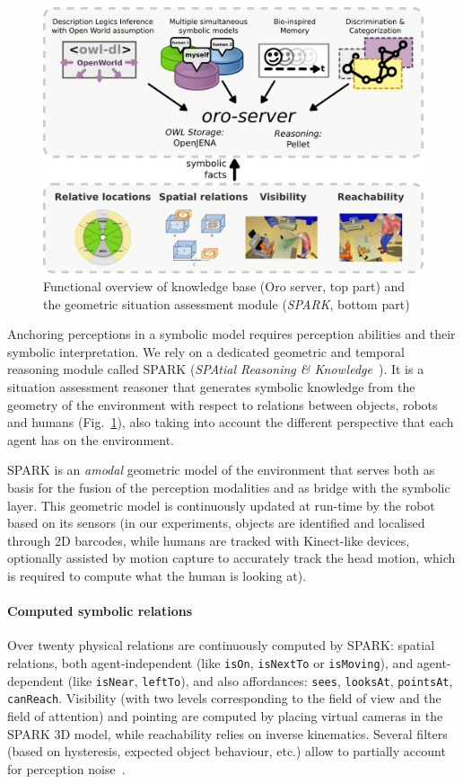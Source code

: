 \documentclass[letterpaper, 10 pt, conference]{ieeeconf}  %
\newcommand{\concept}[1]{{\small \texttt{#1}}}
\begin{document}
\begin{figure}
        \centering
        \includegraphics[width=\columnwidth]{spark-oro}
    \caption{Functional overview of knowledge base ({\sc Oro} server, top part) and the geometric situation assessment module (\emph{SPARK}, bottom part)}
        \label{fig|spark-oro}
\end{figure}

Anchoring perceptions in a symbolic model requires perception abilities and
their symbolic interpretation. We rely on a dedicated geometric and temporal
reasoning module called SPARK (\emph{SPAtial Reasoning \&
Knowledge}~\cite{Sisbot2011}). It is a situation assessment reasoner that
generates symbolic knowledge from the geometry of the environment with respect
to relations between objects, robots and humans (Fig.~\ref{fig|spark-oro}),
also taking into account the different perspective that each agent has on the
environment.

SPARK is an \emph{amodal} geometric model of the environment that serves both
as basis for the fusion of the perception modalities and as bridge with the
symbolic layer. This geometric model is continuously updated at run-time by the
robot based on its sensors (in our experiments, objects are identified and
localised through 2D barcodes, while humans are tracked with Kinect-like
devices, optionally assisted by motion capture to accurately track the head
motion, which is required to compute what the human is looking at).

\paragraph*{Computed symbolic relations} Over twenty physical relations are
continuously computed by SPARK: spatial relations, both agent-independent (like
\concept{isOn}, \concept{isNextTo} or \concept{isMoving}), and agent-dependent
(like \concept{isNear}, \concept{leftTo}), and also affordances:
\concept{sees}, \concept{looksAt}, \concept{pointsAt}, \concept{canReach}.
Visibility (with two levels corresponding to the field of view and the field of
attention) and pointing are computed by placing virtual cameras in the SPARK 3D
model, while reachability relies on inverse kinematics. Several filters (based
on hysteresis, expected object behaviour, etc.) allow to partially account for
perception noise~\cite{Warnier2012a}.
\end{document}
